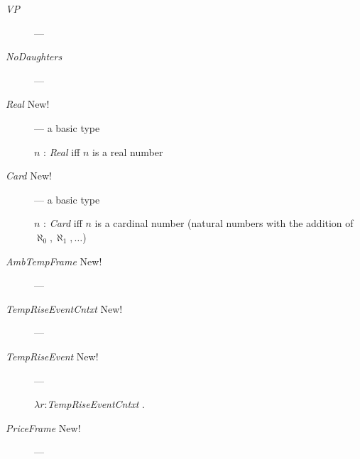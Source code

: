 \begin{description}
\item[\textnormal{\textit{VP}}] --- 

  
\item[\textnormal{\textit{NoDaughters}}] ---

  
\item[\textnormal{\textit{Real}} New!] --- a basic type

  $n$ : \textit{Real} iff $n$ is a real number

  
\item[\textnormal{\textit{Card}} New!] --- a basic type

  $n$ : \textit{Card} iff $n$ is a cardinal number (natural numbers
  with the addition of $\aleph_0, \aleph_1,\ldots$)
 

  

\item[\textnormal{\textit{AmbTempFrame}} New!] --- 

      
    \item[\textnormal{\textit{TempRiseEventCntxt}} New!] ---
      
    \item[\textnormal{\textit{TempRiseEvent}} New!] ---
      
      $\lambda r$:\textit{TempRiseEventCntxt} .\\  
\hspace*{2em}
      
    \item[\textnormal{\textit{PriceFrame}} New!] --- 
      

\end{description}
